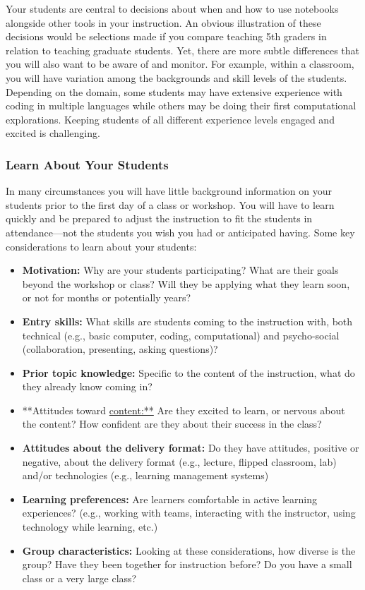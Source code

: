 \documentclass[]{book}
\providecommand{\tightlist}{%
  \setlength{\itemsep}{0pt}\setlength{\parskip}{0pt}}
\begin{document}
Your students are central to decisions about when and how to use
notebooks alongside other tools in your instruction. An obvious
illustration of these decisions would be selections made if you compare
teaching 5th graders in relation to teaching graduate students. Yet,
there are more subtle differences that you will also want to be aware of
and monitor. For example, within a classroom, you will have variation
among the backgrounds and skill levels of the students. Depending on the
domain, some students may have extensive experience with coding in
multiple languages while others may be doing their first computational
explorations. Keeping students of all different experience levels
engaged and excited is challenging.

\subsubsection{Learn About Your
Students}\label{learn-about-your-students}

In many circumstances you will have little background information on
your students prior to the first day of a class or workshop. You will
have to learn quickly and be prepared to adjust the instruction to fit
the students in attendance---not the students you wish you had or
anticipated having. Some key considerations to learn about your
students:

\begin{itemize}
\tightlist
\item
  \textbf{Motivation:} Why are your students participating? What are
  their goals beyond the workshop or class? Will they be applying what
  they learn soon, or not for months or potentially years?
\item
  \textbf{Entry skills:} What skills are students coming to the
  instruction with, both technical (e.g., basic computer, coding,
  computational) and psycho-social (collaboration, presenting, asking
  questions)?
\item
  \textbf{Prior topic knowledge:} Specific to the content of the
  instruction, what do they already know coming in?
\item
  **Attitudes toward \url{content:**} Are they excited to learn, or
  nervous about the content? How confident are they about their success
  in the class?
\item
  \textbf{Attitudes about the delivery format:} Do they have attitudes,
  positive or negative, about the delivery format (e.g., lecture,
  flipped classroom, lab) and/or technologies (e.g., learning management
  systems)
\item
  \textbf{Learning preferences:} Are learners comfortable in active
  learning experiences? (e.g., working with teams, interacting with the
  instructor, using technology while learning, etc.)
\item
  \textbf{Group characteristics:} Looking at these considerations, how
  diverse is the group? Have they been together for instruction before?
  Do you have a small class or a very large class?
\end{itemize}
\end{document}
